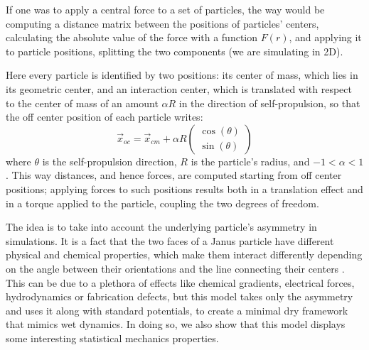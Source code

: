\documentclass[../../master_thesis_np.tex]{subfiles}
\begin{document}
	If one was to apply a central force to a set of particles, the way would be computing a distance matrix between the positions of particles' centers, calculating the absolute value of the force with a function $F(r)$, and applying it to particle positions, splitting the two components (we are simulating in 2D).
	
	Here every particle is identified by two positions: its center of mass, which lies in its geometric center, and an interaction center, which is translated with respect to the center of mass of an amount $\alpha R$ in the direction of self-propulsion, so that the off center position of each particle writes:
	\begin{equation}
		\vec{x}_{oc} = \vec{x}_{cm} + \alpha R 
		\begin{pmatrix}
			\cos(\theta)\\
			\sin(\theta)
		\end{pmatrix}
	\end{equation}
	where $\theta$ is the self-propulsion direction, $R$ is the particle's radius, and $-1 < \alpha < 1$. This way distances, and hence forces, are computed starting from off center positions; applying forces to such positions results both in a translation effect and in a torque applied to the particle, coupling the two degrees of freedom.
	
	The idea is to take into account the underlying particle's asymmetry in simulations. It is a fact that the two faces of a Janus particle have different physical and chemical properties, which make them interact differently depending on the angle between their orientations and the line connecting their centers \cite{singh_pair_2024}. This can be due to a plethora of effects like chemical gradients, electrical forces, hydrodynamics or fabrication defects, but this model takes only the asymmetry and uses it along with standard potentials, to create a minimal dry framework that mimics wet dynamics. In doing so, we also show that this model displays some interesting statistical mechanics properties.
	
\end{document}
